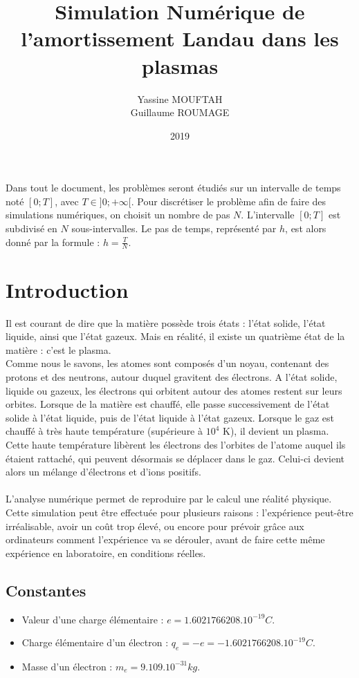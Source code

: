 \documentclass{article}
\title{Simulation Numérique de l'amortissement Landau dans les plasmas}
\date{2019}
\author{Yassine MOUFTAH\\Guillaume ROUMAGE}
\begin{document}
\maketitle
\newpage
\noindent Dans tout le document, les problèmes seront étudiés sur un intervalle de temps noté $[0;T]$, avec $T \in ]0; + \infty[$. Pour discrétiser le problème afin de faire des simulations numériques, on choisit un nombre de pas $N$. L'intervalle $[0;T]$ est subdivisé en $N$ sous-intervalles. Le pas de temps, représenté par $h$, est alors donné par la formule : $h = \frac{T}{N}$.
\newpage
\section*{Introduction}
Il est courant de dire que la matière possède trois états : l'état solide, l'état liquide, ainsi que l'état gazeux. Mais en réalité, il existe un quatrième état de la matière : c'est le plasma.\\
Comme nous le savons, les atomes sont composés d'un noyau, contenant des protons et des neutrons, autour duquel gravitent des électrons. A l'état solide, liquide ou gazeux, les électrons qui orbitent autour des atomes restent sur leurs orbites. Lorsque de la matière est chauffé, elle passe successivement de l'état solide à l'état liquide, puis de l'état liquide à l'état gazeux. Lorsque le gaz est chauffé à très haute température (supérieure à $10^4$ K), il devient un plasma.\\
Cette haute température libèrent les électrons des l'orbites de l'atome auquel ils étaient rattaché, qui peuvent désormais se déplacer dans le gaz. Celui-ci devient alors un mélange d'électrons et d'ions positifs.\\
\\
L'analyse numérique permet de reproduire par le calcul une réalité physique. Cette simulation peut être effectuée pour plusieurs raisons : l'expérience peut-être irréalisable, avoir un coût trop élevé, ou encore pour prévoir grâce aux ordinateurs comment l'expérience va se dérouler, avant de faire cette même expérience en laboratoire, en conditions réelles.
\subsection*{Constantes}
\begin{itemize}
\item Valeur d'une charge élémentaire : $e = 1.6021766208.10^{-19} C$.
\item Charge élémentaire d'un électron : $q_e = -e = -1.6021766208.10^{-19} C$.
\item Masse d'un électron : $m_e = 9.109.10^{-31} kg$.
\end{itemize}
\end{document}
